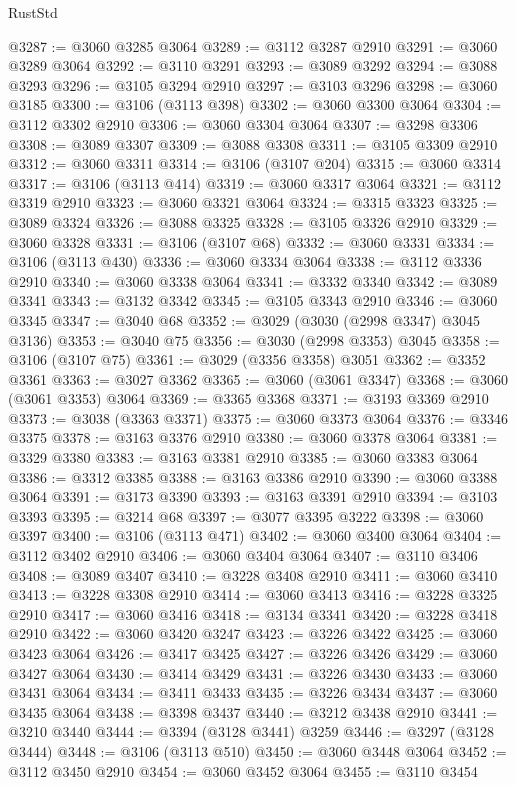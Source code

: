 \begin{lexlean}{RustStd}
\begin{coremodule}
@3287 := @3060 @3285 @3064
@3289 := @3112 @3287 @2910
@3291 := @3060 @3289 @3064
@3292 := @3110 @3291
@3293 := @3089 @3292
@3294 := @3088 @3293
@3296 := @3105 @3294 @2910
@3297 := @3103 @3296
@3298 := @3060 @3185
@3300 := @3106 (@3113 @398)
@3302 := @3060 @3300 @3064
@3304 := @3112 @3302 @2910
@3306 := @3060 @3304 @3064
@3307 := @3298 @3306
@3308 := @3089 @3307
@3309 := @3088 @3308
@3311 := @3105 @3309 @2910
@3312 := @3060 @3311
@3314 := @3106 (@3107 @204)
@3315 := @3060 @3314
@3317 := @3106 (@3113 @414)
@3319 := @3060 @3317 @3064
@3321 := @3112 @3319 @2910
@3323 := @3060 @3321 @3064
@3324 := @3315 @3323
@3325 := @3089 @3324
@3326 := @3088 @3325
@3328 := @3105 @3326 @2910
@3329 := @3060 @3328
@3331 := @3106 (@3107 @68)
@3332 := @3060 @3331
@3334 := @3106 (@3113 @430)
@3336 := @3060 @3334 @3064
@3338 := @3112 @3336 @2910
@3340 := @3060 @3338 @3064
@3341 := @3332 @3340
@3342 := @3089 @3341
@3343 := @3132 @3342
@3345 := @3105 @3343 @2910
@3346 := @3060 @3345
@3347 := @3040 @68
@3352 := @3029 (@3030 (@2998 @3347) @3045 @3136)
@3353 := @3040 @75
@3356 := @3030 (@2998 @3353) @3045
@3358 := @3106 (@3107 @75)
@3361 := @3029 (@3356 @3358) @3051
@3362 := @3352 @3361
@3363 := @3027 @3362
@3365 := @3060 (@3061 @3347)
@3368 := @3060 (@3061 @3353) @3064
@3369 := @3365 @3368
@3371 := @3193 @3369 @2910
@3373 := @3038 (@3363 @3371)
@3375 := @3060 @3373 @3064
@3376 := @3346 @3375
@3378 := @3163 @3376 @2910
@3380 := @3060 @3378 @3064
@3381 := @3329 @3380
@3383 := @3163 @3381 @2910
@3385 := @3060 @3383 @3064
@3386 := @3312 @3385
@3388 := @3163 @3386 @2910
@3390 := @3060 @3388 @3064
@3391 := @3173 @3390
@3393 := @3163 @3391 @2910
@3394 := @3103 @3393
@3395 := @3214 @68
@3397 := @3077 @3395 @3222
@3398 := @3060 @3397
@3400 := @3106 (@3113 @471)
@3402 := @3060 @3400 @3064
@3404 := @3112 @3402 @2910
@3406 := @3060 @3404 @3064
@3407 := @3110 @3406
@3408 := @3089 @3407
@3410 := @3228 @3408 @2910
@3411 := @3060 @3410
@3413 := @3228 @3308 @2910
@3414 := @3060 @3413
@3416 := @3228 @3325 @2910
@3417 := @3060 @3416
@3418 := @3134 @3341
@3420 := @3228 @3418 @2910
@3422 := @3060 @3420 @3247
@3423 := @3226 @3422
@3425 := @3060 @3423 @3064
@3426 := @3417 @3425
@3427 := @3226 @3426
@3429 := @3060 @3427 @3064
@3430 := @3414 @3429
@3431 := @3226 @3430
@3433 := @3060 @3431 @3064
@3434 := @3411 @3433
@3435 := @3226 @3434
@3437 := @3060 @3435 @3064
@3438 := @3398 @3437
@3440 := @3212 @3438 @2910
@3441 := @3210 @3440
@3444 := @3394 (@3128 @3441) @3259
@3446 := @3297 (@3128 @3444)
@3448 := @3106 (@3113 @510)
@3450 := @3060 @3448 @3064
@3452 := @3112 @3450 @2910
@3454 := @3060 @3452 @3064
@3455 := @3110 @3454

\end{coremodule}
\end{lexlean}
